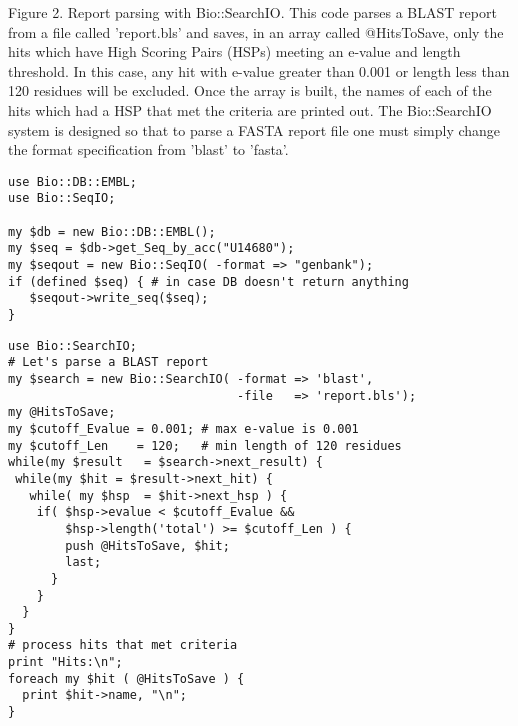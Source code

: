 \documentclass[12pt]{article}
\begin{document}
\newpage


Figure 2. Report parsing with Bio::SearchIO.  This code parses a BLAST
report from a file called 'report.bls' and saves, in an array called
@HitsToSave, only the hits which have High Scoring Pairs (HSPs) meeting
an e-value and length threshold.  In this case, any hit with e-value
greater than 0.001 or length less than 120 residues will be excluded.
Once the array is built, the names of each of the hits which had a HSP
that met the criteria are printed out.  The Bio::SearchIO system is
designed so that to parse a FASTA \cite{fasta} report file one must
simply change the format specification from 'blast' to 'fasta'.

\newpage

\singlespacing

\begin{verbatim}
use Bio::DB::EMBL;
use Bio::SeqIO;

my $db = new Bio::DB::EMBL();
my $seq = $db->get_Seq_by_acc("U14680");
my $seqout = new Bio::SeqIO( -format => "genbank");
if (defined $seq) { # in case DB doesn't return anything
   $seqout->write_seq($seq);
}
\end{verbatim}

\newpage

\begin{verbatim}
use Bio::SearchIO;
# Let's parse a BLAST report 
my $search = new Bio::SearchIO( -format => 'blast',
                                -file   => 'report.bls');
my @HitsToSave;
my $cutoff_Evalue = 0.001; # max e-value is 0.001
my $cutoff_Len    = 120;   # min length of 120 residues
while(my $result   = $search->next_result) {
 while(my $hit = $result->next_hit) {
   while( my $hsp  = $hit->next_hsp ) {
    if( $hsp->evalue < $cutoff_Evalue && 
        $hsp->length('total') >= $cutoff_Len ) { 
        push @HitsToSave, $hit;
        last;
      } 
    }
  }
}
# process hits that met criteria
print "Hits:\n";
foreach my $hit ( @HitsToSave ) {
  print $hit->name, "\n";	
}

\end{verbatim}
\end{document}
